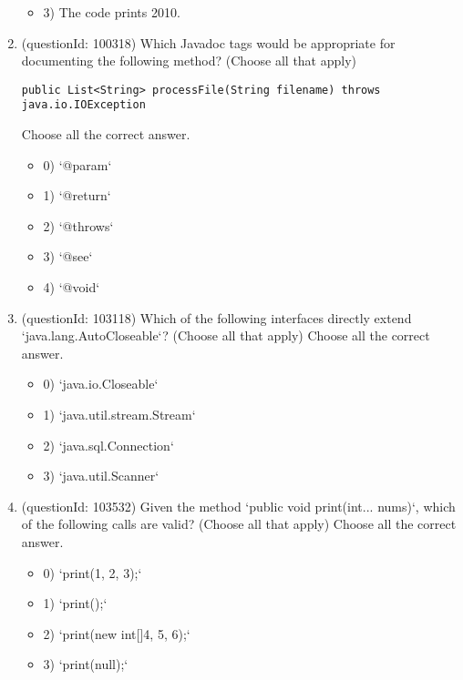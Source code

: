 \documentclass[12pt]{article}
\begin{document}
\begin{enumerate}[label=(\arabic*)]
\begin{itemize}
\item 3) The code prints 2010.

\end{itemize}
\item (questionId: 100318) Which Javadoc tags would be appropriate for documenting the following method? (Choose all that apply)
\begin{verbatim}
public List<String> processFile(String filename) throws java.io.IOException
\end{verbatim}
Choose all the correct answer.\begin{itemize}
\item 0) `@param`

\item 1) `@return`

\item 2) `@throws`

\item 3) `@see`

\item 4) `@void`

\end{itemize}
\item (questionId: 103118) Which of the following interfaces directly extend `java.lang.AutoCloseable`? (Choose all that apply)
Choose all the correct answer.\begin{itemize}
\item 0) `java.io.Closeable`

\item 1) `java.util.stream.Stream`

\item 2) `java.sql.Connection`

\item 3) `java.util.Scanner`

\end{itemize}
\item (questionId: 103532) Given the method `public void print(int... nums)`, which of the following calls are valid? (Choose all that apply)
Choose all the correct answer.\begin{itemize}
\item 0) `print(1, 2, 3);`

\item 1) `print();`

\item 2) `print(new int[]{4, 5, 6});`

\item 3) `print(null);`


\end{itemize}
\end{enumerate}
\end{document}
